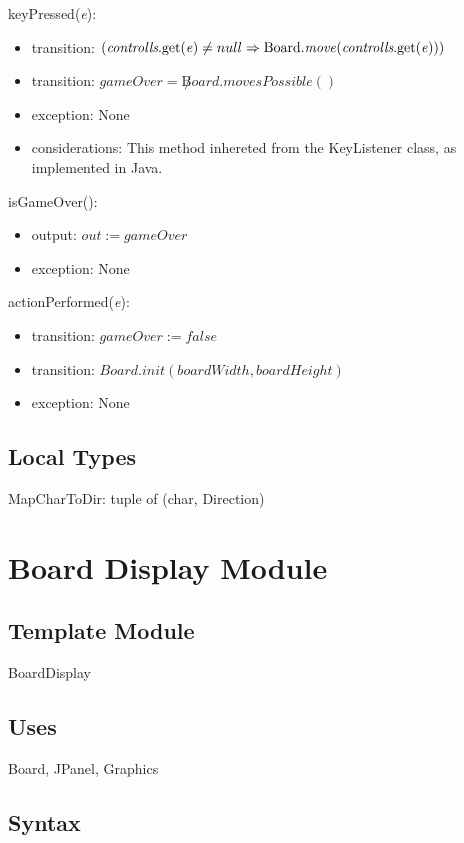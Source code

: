 \documentclass{article}
\begin{document}
			\noindent keyPressed(\textit{e}):
			\begin{itemize}
				\item transition: $(\textrm{\textit{controlls}.get(\textit{e})} \neq null \Rightarrow \textrm{Board.\textit{move}(\textit{controlls}.get(\textit{e}))})$
				\item transition: $gameOver = \not Board.movesPossible()$
				\item exception: None
				\item considerations: This method inhereted from the KeyListener class, as implemented in Java.
			\end{itemize}

			\noindent isGameOver():
			\begin{itemize}
				\item output: $out := gameOver$
				\item exception: None
			\end{itemize}

			\noindent actionPerformed(\textit{e}):
			\begin{itemize}
				\item transition: $gameOver := false$
				\item transition: $Board.init(boardWidth, boardHeight)$
				\item exception: None
			\end{itemize}

	\subsection*{Local Types}
		\noindent MapCharToDir: tuple of (char, Direction)

\newpage

\section*{Board Display Module}

	\subsection*{Template Module}
		BoardDisplay

	\subsection*{Uses}
		Board, JPanel, Graphics

	\subsection*{Syntax}
\end{document}
